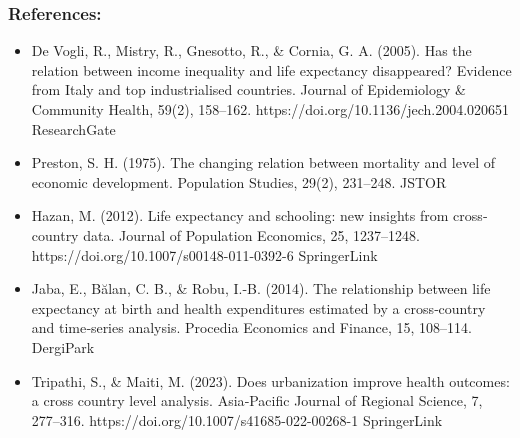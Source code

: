 \documentclass[
  11pt,
]{article}
\begin{document}
\subsubsection{References:}\label{references}

\begin{itemize}
\item
  De Vogli, R., Mistry, R., Gnesotto, R., \& Cornia, G. A. (2005). Has
  the relation between income inequality and life expectancy
  disappeared? Evidence from Italy and top industrialised countries.
  Journal of Epidemiology \& Community Health, 59(2), 158--162.
  https://doi.org/10.1136/jech.2004.020651 ResearchGate
\item
  Preston, S. H. (1975). The changing relation between mortality and
  level of economic development. Population Studies, 29(2), 231--248.
  JSTOR
\item
  Hazan, M. (2012). Life expectancy and schooling: new insights from
  cross‐country data. Journal of Population Economics, 25, 1237--1248.
  https://doi.org/10.1007/s00148-011-0392-6 SpringerLink
\item
  Jaba, E., Bălan, C. B., \& Robu, I.-B. (2014). The relationship
  between life expectancy at birth and health expenditures estimated by
  a cross‐country and time‐series analysis. Procedia Economics and
  Finance, 15, 108--114. DergiPark
\item
  Tripathi, S., \& Maiti, M. (2023). Does urbanization improve health
  outcomes: a cross country level analysis. Asia‐Pacific Journal of
  Regional Science, 7, 277--316.
  https://doi.org/10.1007/s41685-022-00268-1 SpringerLink
\end{itemize}
\end{document}
